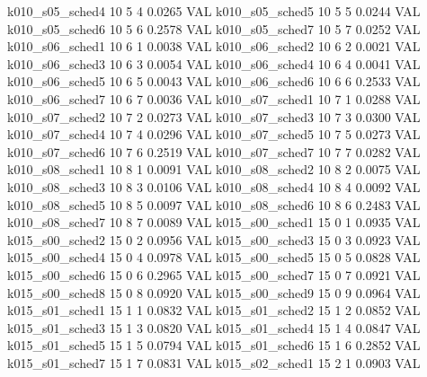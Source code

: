   k010_s05_sched4                   10    5   4    0.0265  VAL
  k010_s05_sched5                   10    5   5    0.0244  VAL
  k010_s05_sched6                   10    5   6    0.2578  VAL
  k010_s05_sched7                   10    5   7    0.0252  VAL
  k010_s06_sched1                   10    6   1    0.0038  VAL
  k010_s06_sched2                   10    6   2    0.0021  VAL
  k010_s06_sched3                   10    6   3    0.0054  VAL
  k010_s06_sched4                   10    6   4    0.0041  VAL
  k010_s06_sched5                   10    6   5    0.0043  VAL
  k010_s06_sched6                   10    6   6    0.2533  VAL
  k010_s06_sched7                   10    6   7    0.0036  VAL
  k010_s07_sched1                   10    7   1    0.0288  VAL
  k010_s07_sched2                   10    7   2    0.0273  VAL
  k010_s07_sched3                   10    7   3    0.0300  VAL
  k010_s07_sched4                   10    7   4    0.0296  VAL
  k010_s07_sched5                   10    7   5    0.0273  VAL
  k010_s07_sched6                   10    7   6    0.2519  VAL
  k010_s07_sched7                   10    7   7    0.0282  VAL
  k010_s08_sched1                   10    8   1    0.0091  VAL
  k010_s08_sched2                   10    8   2    0.0075  VAL
  k010_s08_sched3                   10    8   3    0.0106  VAL
  k010_s08_sched4                   10    8   4    0.0092  VAL
  k010_s08_sched5                   10    8   5    0.0097  VAL
  k010_s08_sched6                   10    8   6    0.2483  VAL
  k010_s08_sched7                   10    8   7    0.0089  VAL
  k015_s00_sched1                   15    0   1    0.0935  VAL
  k015_s00_sched2                   15    0   2    0.0956  VAL
  k015_s00_sched3                   15    0   3    0.0923  VAL
  k015_s00_sched4                   15    0   4    0.0978  VAL
  k015_s00_sched5                   15    0   5    0.0828  VAL
  k015_s00_sched6                   15    0   6    0.2965  VAL
  k015_s00_sched7                   15    0   7    0.0921  VAL
  k015_s00_sched8                   15    0   8    0.0920  VAL
  k015_s00_sched9                   15    0   9    0.0964  VAL
  k015_s01_sched1                   15    1   1    0.0832  VAL
  k015_s01_sched2                   15    1   2    0.0852  VAL
  k015_s01_sched3                   15    1   3    0.0820  VAL
  k015_s01_sched4                   15    1   4    0.0847  VAL
  k015_s01_sched5                   15    1   5    0.0794  VAL
  k015_s01_sched6                   15    1   6    0.2852  VAL
  k015_s01_sched7                   15    1   7    0.0831  VAL
  k015_s02_sched1                   15    2   1    0.0903  VAL
